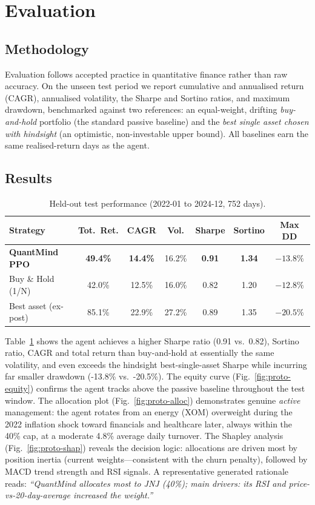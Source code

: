 \section{Evaluation}

\subsection{Methodology}
Evaluation follows accepted practice in quantitative finance rather than raw
accuracy. On the unseen test period we report cumulative and annualised return
(CAGR), annualised volatility, the Sharpe \cite{sharpe1966} and Sortino
\cite{sortino1994} ratios, and maximum drawdown, benchmarked against two
references: an equal-weight, drifting \emph{buy-and-hold} portfolio (the standard
passive baseline) and the \emph{best single asset chosen with hindsight} (an
optimistic, non-investable upper bound). All baselines earn the same
realised-return days as the agent.

\subsection{Results}
\begin{table}[h]
\centering
\caption{Held-out test performance (2022-01 to 2024-12, 752 days).}
\label{tab:proto-results}
\begin{tabular}{lcccccc}
\toprule
Strategy & Tot.\ Ret. & CAGR & Vol. & Sharpe & Sortino & Max DD \\
\midrule
\textbf{QuantMind PPO} & \textbf{49.4\%} & \textbf{14.4\%} & 16.2\% & \textbf{0.91} & \textbf{1.34} & $-13.8\%$ \\
Buy \& Hold (1/N)      & 42.0\% & 12.5\% & 16.0\% & 0.82 & 1.20 & $-12.8\%$ \\
Best asset (ex-post)   & 85.1\% & 22.9\% & 27.2\% & 0.89 & 1.35 & $-20.5\%$ \\
\bottomrule
\end{tabular}
\end{table}

Table~\ref{tab:proto-results} shows the agent achieves a higher Sharpe ratio
(0.91 vs.\ 0.82), Sortino ratio, CAGR and total return than buy-and-hold at
essentially the same volatility, and even exceeds the hindsight best-single-asset
Sharpe while incurring far smaller drawdown (-13.8\% vs.\ -20.5\%). The equity
curve (Fig.~\ref{fig:proto-equity}) confirms the agent tracks above the passive
baseline throughout the test window. The allocation plot
(Fig.~\ref{fig:proto-alloc}) demonstrates genuine \emph{active} management: the
agent rotates from an energy (XOM) overweight during the 2022 inflation shock
toward financials and healthcare later, always within the 40\% cap, at a moderate
4.8\% average daily turnover. The Shapley analysis
(Fig.~\ref{fig:proto-shap}) reveals the decision logic: allocations are driven
most by position inertia (current weights---consistent with the churn penalty),
followed by MACD trend strength and RSI signals. A representative generated
rationale reads: \emph{``QuantMind allocates most to JNJ (40\%); main drivers:
its RSI and price-vs-20-day-average increased the weight.''}

